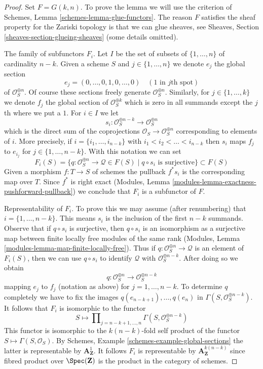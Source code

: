 \begin{proof}
Set $F = G(k, n)$. To prove the lemma we will use the criterion of
Schemes, Lemma \ref{schemes-lemma-glue-functors}.
The reason $F$ satisfies the sheaf property for the
Zariski topology is that we can glue sheaves, see Sheaves,
Section \ref{sheaves-section-glueing-sheaves} (some details omitted).

\medskip\noindent
The family of subfunctors $F_i$.
Let $I$ be the set of subsets of $\{1, \ldots, n\}$ of cardinality $n - k$.
Given a scheme $S$ and $j \in \{1, \ldots, n\}$ we denote $e_j$
the global section
$$
e_j = (0, \ldots, 0, 1, 0, \ldots, 0)\quad(1\text{ in }j\text{th spot})
$$
of $\mathcal{O}_S^{\oplus n}$. Of course these sections freely generate
$\mathcal{O}_S^{\oplus n}$. Similarly, for $j \in \{1, \ldots, k\}$
we denote $f_j$ the global section of $\mathcal{O}_S^{\oplus k}$
which is zero in all summands except the $j$th where we put a $1$.
For $i \in I$ we let
$$
s_i : \mathcal{O}_S^{\oplus n - k} \longrightarrow \mathcal{O}_S^{\oplus n}
$$
which is the direct sum of the coprojections
$\mathcal{O}_S \to \mathcal{O}_S^{\oplus n}$ corresponding to elements of $i$.
More precisely, if $i = \{i_1, \ldots, i_{n - k}\}$ with
$i_1 < i_2 < \ldots < i_{n - k}$
then $s_i$ maps $f_j$ to $e_{i_j}$ for $j \in \{1, \ldots, n - k\}$.
With this notation we can set
$$
F_i(S) = \{q : \mathcal{O}_S^{\oplus n} \to \mathcal{Q} \in F(S) \mid
q \circ s_i \text{ is surjective}\}
\subset F(S)
$$
Given a morphism $f : T \to S$ of schemes the pullback $f^*s_i$
is the corresponding map over $T$. Since $f^*$ is right exact
(Modules, Lemma \ref{modules-lemma-exactness-pushforward-pullback})
we conclude that $F_i$ is a subfunctor of $F$.

\medskip\noindent
Representability of $F_i$. To prove this we may assume (after renumbering)
that $i = \{1, \ldots, n - k\}$. This means $s_i$ is the inclusion of
the first $n - k$ summands. Observe that if $q \circ s_i$ is surjective,
then $q \circ s_i$ is an isomorphism as a surjective map between finite
locally free modules of the same rank
(Modules, Lemma \ref{modules-lemma-map-finite-locally-free}).
Thus if $q : \mathcal{O}_S^{\oplus n} \to \mathcal{Q}$ is an element of
$F_i(S)$, then we can use $q \circ s_i$ to identify $\mathcal{Q}$ with
$\mathcal{O}_S^{\oplus n - k}$. After doing so we obtain
$$
q : \mathcal{O}_S^{\oplus n} \longrightarrow \mathcal{O}_S^{\oplus n - k}
$$
mapping $e_j$ to $f_j$ (notation as above) for $j = 1, \ldots, n - k$.
To determine $q$ completely we have to fix the images
$q(e_{n - k + 1}), \ldots, q(e_n)$ in
$\Gamma(S, \mathcal{O}_S^{\oplus n - k})$.
It follows that $F_i$ is isomorphic to the functor
$$
S \longmapsto
\prod\nolimits_{j = n - k + 1, \ldots, n}
\Gamma(S,  \mathcal{O}_S^{\oplus n - k})
$$
This functor is isomorphic to the $k(n - k)$-fold self product of the functor
$S \mapsto \Gamma(S, \mathcal{O}_S)$. By
Schemes, Example \ref{schemes-example-global-sections}
the latter is representable by $\mathbf{A}^1_\mathbf{Z}$. It follows $F_i$
is representable by $\mathbf{A}^{k(n - k)}_\mathbf{Z}$ since fibred product
over $\Spec(\mathbf{Z})$ is the product in the category of schemes.


\end{proof}
